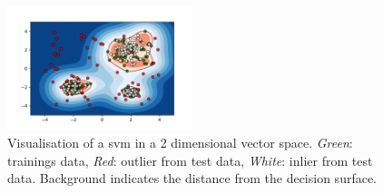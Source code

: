\begin{figure}
	\centering
	\includegraphics[width=0.48\textwidth,trim={12mm 5mm 15mm 10mm},keepaspectratio,clip]{figures/200-background-oneclass.pdf}
	\caption[Visualisation of a Support Vector Machine]{Visualisation of a \gls{svm} in a 2 dimensional vector space. \emph{Green}: trainings data, \emph{Red}: outlier from test data, \emph{White}: inlier from test data. Background indicates the distance from the decision surface.}
	\label{fig:background:network:novelty:svm}
\end{figure}

